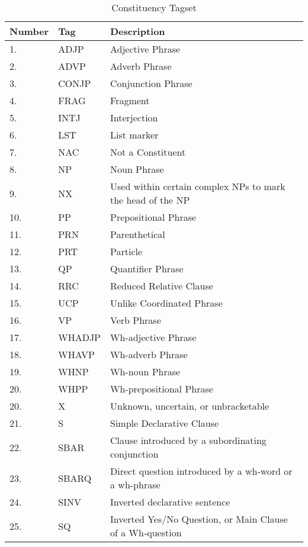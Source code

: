 \begin{table}[h]
\end{table}

\begin{table}[h]
	\centering
	      \caption{Constituency Tagset}
     \label{table:AllConstituencyTags}
    \begin{tabular}{| l | l | l |}
    \hline
Number & Tag & Description \\ \hline
	\hline
1. & 	ADJP & Adjective Phrase \\ \hline
2. & 	ADVP & Adverb Phrase \\ \hline
3. & 	CONJP  &  Conjunction Phrase \\ \hline
4. & 	FRAG  & Fragment \\ \hline
5. & 	INTJ & Interjection \\ \hline
6. & 	LST  &	 List marker \\ \hline
7. & 	NAC & Not a Constituent \\ \hline
8. & 	NP &	Noun Phrase \\ \hline
9. & 	NX &	Used within certain complex NPs to mark the head of the NP \\ \hline
10. & 	PP &  Prepositional Phrase \\ \hline
11. & 	PRN &  Parenthetical \\ \hline
12. & 	PRT &	Particle \\ \hline
13. & 	QP & Quantifier Phrase\\ \hline
14. & 	RRC& 	 Reduced Relative Clause\\ \hline
15. & 	UCP & Unlike Coordinated Phrase \\ \hline
16. & 	VP & Verb Phrase \\ \hline
17. & 	WHADJP & Wh-adjective Phrase \\ \hline
18. & 	WHAVP & Wh-adverb Phrase \\ \hline
19. & 	WHNP & Wh-noun Phrase \\ \hline
20. & 	WHPP &	Wh-prepositional Phrase \\ \hline
20. & 	X & Unknown, uncertain, or unbracketable\\ \hline
 \hline
21. & 	S &  Simple Declarative Clause \\ \hline
22. & SBAR &   Clause introduced by a subordinating conjunction \\ \hline
23. & 	SBARQ &  Direct question introduced by a wh-word or a wh-phrase \\ \hline
24. & 	SINV &   Inverted declarative sentence \\ \hline
25. & SQ & Inverted Yes/No Question, or Main Clause of a Wh-question\\ \hline

    \end{tabular}

\end{table}



